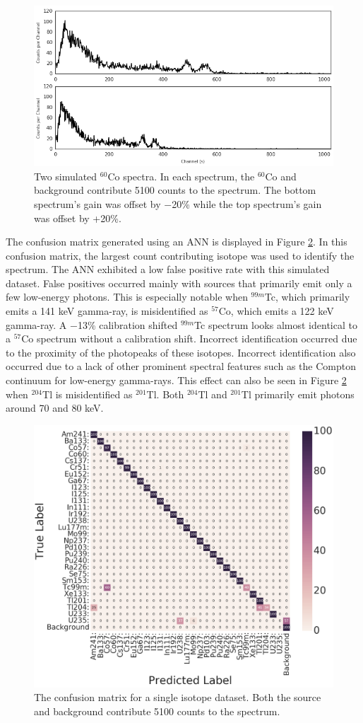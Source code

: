 \documentclass[tocnosub,noragright,centerchapter,12pt,fullpage]{uiucecethesis09}
\begin{document}
\begin{figure}[H]
\centering
\includegraphics[width=0.75\linewidth]{images/Co60_both_60s}
\caption{Two simulated $^{60}$Co spectra. In each spectrum, the $^{60}$Co and background contribute 5100 counts to the spectrum. The bottom spectrum's gain was offset by $-$20\% while the top spectrum's gain was offset by +20\%.}
\label{fig:co60_diff_pmt_60s}
\end{figure}

The confusion matrix generated using an ANN is displayed in Figure \ref{fig:conf_matrix_60s}. In this confusion matrix, the largest count contributing isotope was used to identify the spectrum. The ANN exhibited a low false positive rate with this simulated dataset. False positives occurred mainly with sources that primarily emit only a few low-energy photons. This is especially notable when $^{99m}$Tc, which primarily emits a 141 keV gamma-ray, is misidentified as $^{57}$Co, which emits a 122 keV gamma-ray. A $-$13\% calibration shifted  $^{99m}$Tc spectrum looks almost identical to a $^{57}$Co spectrum without a calibration shift. Incorrect identification occurred due to the proximity of the photopeaks of these isotopes. Incorrect identification also occurred due to a lack of other prominent spectral features such as the Compton continuum for low-energy gamma-rays. This effect can also be seen in Figure \ref{fig:conf_matrix_60s} when $^{204}$Tl is misidentified as $^{201}$Tl. Both $^{204}$Tl and $^{201}$Tl primarily emit photons around 70 and 80 keV.




\begin{figure}[H]
\centering
\includegraphics[width=0.7\linewidth]{images/conf_matrix_60s}
\caption{The confusion matrix for a single isotope dataset. Both the source and background contribute 5100 counts to the spectrum.}
\label{fig:conf_matrix_60s}
\end{figure}
\end{document}
